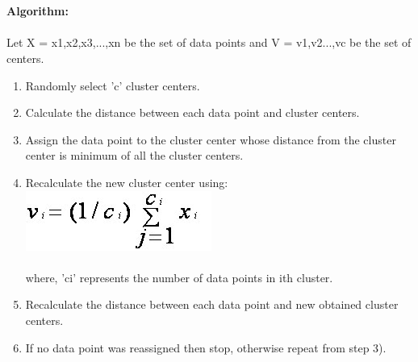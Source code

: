 \documentclass[10pt,a4paper]{article}
\begin{document}
\\\\
\textbf{Algorithm:}
\\\\
Let  X = {x1,x2,x3,...,xn} be the set of data points and V = {v1,v2...,vc} be the set of centers.
\begin{enumerate}
\item Randomly select 'c' cluster centers.
\item Calculate the distance between each data point and cluster centers.
\item Assign the data point to the cluster center whose distance from the cluster center is minimum of all the cluster centers.
\item Recalculate the new cluster center using:
\\\includegraphics[scale=0.5]{im2.png}
\\\\where, 'ci' represents the number of data points in ith cluster.
\item Recalculate the distance between each data point and new obtained cluster centers.
\item If no data point was reassigned then stop, otherwise repeat from step 3).
\end{enumerate}
\end{document}
